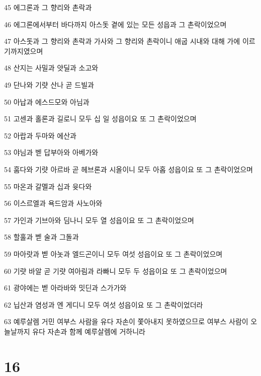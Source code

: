 \par 45 에그론과 그 향리와 촌락과
\par 46 에그론에서부터 바다까지 아스돗 곁에 있는 모든 성읍과 그 촌락이었으며
\par 47 아스돗과 그 향리와 촌락과 가사와 그 향리와 촌락이니 애굽 시내와 대해 가에 이르기까지였으며
\par 48 산지는 사밀과 얏딜과 소고와
\par 49 단나와 기럇 산나 곧 드빌과
\par 50 아납과 에스드모와 아님과
\par 51 고센과 홀론과 길로니 모두 십 일 성읍이요 또 그 촌락이었으며
\par 52 아랍과 두마와 에산과
\par 53 야님과 벧 답부아와 아베가와
\par 54 훔다와 기럇 아르바 곧 헤브론과 시올이니 모두 아홉 성읍이요 또 그 촌락이었으며
\par 55 마온과 갈멜과 십과 윳다와
\par 56 이스르엘과 욕드암과 사노아와
\par 57 가인과 기브아와 딤나니 모두 열 성읍이요 또 그 촌락이었으며
\par 58 할훌과 벧 술과 그돌과
\par 59 마아랏과 벧 아놋과 엘드곤이니 모두 여섯 성읍이요 또 그 촌락이었으며
\par 60 기럇 바알 곧 기럇 여아림과 라빠니 모두 두 성읍이요 또 그 촌락이었으며
\par 61 광야에는 벧 아라바와 밋딘과 스가가와
\par 62 닙산과 염성과 엔 게디니 모두 여섯 성읍이요 또 그 촌락이었더라
\par 63 예루살렘 거민 여부스 사람을 유다 자손이 쫓아내지 못하였으므로 여부스 사람이 오늘날까지 유다 자손과 함께 예루살렘에 거하니라

\chapter{16}

